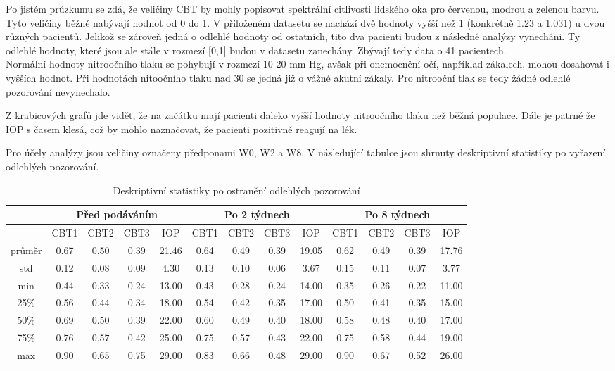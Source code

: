 \documentclass{article}
\begin{document}
Po jistém průzkumu se zdá, že veličiny CBT by mohly popisovat spektrální citlivosti lidského oka pro červenou, modrou a zelenou barvu.
Tyto veličiny běžně nabývají hodnot od 0 do 1.
V přiloženém datasetu se nachází dvě hodnoty vyšší než 1 (konkrétně 1.23 a 1.031) u dvou různých pacientů.
Jelikož se zároveň jedná o odlehlé hodnoty od ostatních, tito dva pacienti budou z následné analýzy vynecháni.
Ty odlehlé hodnoty, které jsou ale stále v rozmezí [0,1] budou v datasetu zanechány.
Zbývají tedy data o 41 pacientech.\\

Normální hodnoty nitroočního tlaku se pohybují v rozmezí 10-20 mm Hg, avšak při onemocnění očí, například zákalech, mohou dosahovat i vyšších hodnot.
Při hodnotách nitoočního tlaku nad 30 se jedná již o vážné akutní zákaly.
Pro nitrooční tlak se tedy žádné odlehlé pozorování nevynechalo.

Z krabicových grafů jde vidět, že na začátku mají pacienti daleko vyšší hodnoty nitroočního tlaku než běžná populace.
Dále je patrné že IOP s časem klesá, což by mohlo naznačovat, že pacienti pozitivně reagují na lék.

Pro účely analýzy jsou veličiny označeny předponami W0, W2 a W8.
V následující tabulce jsou shrnuty deskriptivní statistiky po vyřazení odlehlých pozorování.

\begin{table}[ht]
  \footnotesize
  \centering
  \caption{Deskriptivní statistiky po ostranění odlehlých pozorování}
  \begin{tabular}{|ccccccccccccc|}
    \hline
    & \multicolumn{4}{|c|}{Před podáváním} & \multicolumn{4}{c|}{Po 2 týdnech} & \multicolumn{4}{c|}{Po 8 týdnech} \\
    \hline
    & CBT1 & CBT2 & CBT3 & IOP & CBT1 & CBT2 & CBT3 & IOP & CBT1 & CBT2 & CBT3 & IOP \\
    \hline
    průměr & 0.67 & 0.50 & 0.39 & 21.46 & 0.64 & 0.49 & 0.39 & 19.05 & 0.62 & 0.49 & 0.39 & 17.76 \\
    std & 0.12 & 0.08 & 0.09 & 4.30 & 0.13 & 0.10 & 0.06 & 3.67 & 0.15 & 0.11 & 0.07 & 3.77 \\
    min & 0.44 & 0.33 & 0.24 & 13.00 & 0.43 & 0.28 & 0.24 & 14.00 & 0.35 & 0.26 & 0.22 & 11.00 \\
    25\% & 0.56 & 0.44 & 0.34 & 18.00 & 0.54 & 0.42 & 0.35 & 17.00 & 0.50 & 0.41 & 0.35 & 15.00 \\
    50\% & 0.69 & 0.50 & 0.39 & 22.00 & 0.60 & 0.49 & 0.40 & 18.00 & 0.58 & 0.48 & 0.40 & 17.00 \\
    75\% & 0.76 & 0.57 & 0.42 & 25.00 & 0.75 & 0.57 & 0.43 & 22.00 & 0.75 & 0.58 & 0.44 & 19.00 \\
    max & 0.90 & 0.65 & 0.75 & 29.00 & 0.83 & 0.66 & 0.48 & 29.00 & 0.90 & 0.67 & 0.52 & 26.00 \\
    \hline
  \end{tabular}
\end{table}
\end{document}
